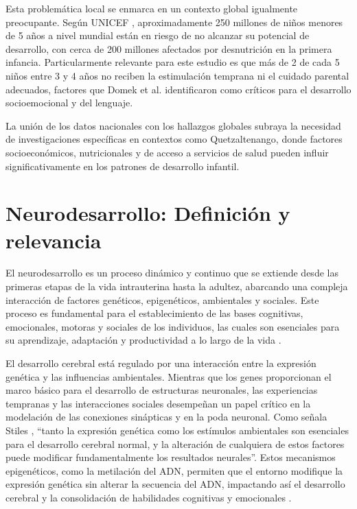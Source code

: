 \documentclass[11pt,letterpaper]{report}
\begin{document}
Esta problemática local se enmarca en un contexto global igualmente 
preocupante. Según UNICEF \cite{UNICEF2023}, aproximadamente 250 millones de 
niños menores de 5 años a nivel mundial están en riesgo de no alcanzar su 
potencial de desarrollo, con cerca de 200 millones afectados por desnutrición 
en la primera infancia. Particularmente relevante para este estudio es que más
de 2 de cada 5 niños entre 3 y 4 años no reciben la estimulación temprana ni el
cuidado parental adecuados, factores que Domek et al. \cite{Domek2023} 
identificaron como críticos para el desarrollo socioemocional y del lenguaje. 

La unión de los datos nacionales con los hallazgos globales subraya la 
necesidad de investigaciones específicas en contextos como Quetzaltenango, 
donde factores socioeconómicos, nutricionales y de acceso a servicios de salud 
pueden influir significativamente en los patrones de desarrollo infantil.

\section{Neurodesarrollo: Definición y relevancia}
El neurodesarrollo es un proceso dinámico y continuo que se extiende desde 
las primeras etapas de la vida intrauterina hasta la adultez, abarcando una 
compleja interacción de factores genéticos, epigenéticos, ambientales y 
sociales. Este proceso es fundamental para el establecimiento de las bases 
cognitivas, emocionales, motoras y sociales de los individuos, las cuales 
son esenciales para su aprendizaje, adaptación y productividad a lo largo 
de la vida \cite{Stiles2010, Nelson49}.

El desarrollo cerebral está regulado por una interacción entre la expresión 
genética y las influencias ambientales. Mientras que los genes proporcionan 
el marco básico para el desarrollo de estructuras neuronales, las 
experiencias tempranas y las interacciones sociales desempeñan un papel 
crítico en la modelación de las conexiones sinápticas y en la poda neuronal. 
Como señala Stiles \cite{Stiles2010}, ``tanto la expresión genética como los
estímulos ambientales son esenciales para el desarrollo cerebral normal, y la
alteración de cualquiera de estos factores puede modificar fundamentalmente los
resultados neurales''. Estos mecanismos epigenéticos, como la metilación del
ADN, permiten que el entorno modifique la expresión genética sin alterar la
secuencia del ADN,  impactando así el desarrollo cerebral y la consolidación de
habilidades cognitivas y emocionales \cite{Roth2011, Feldman2}.
\end{document}
